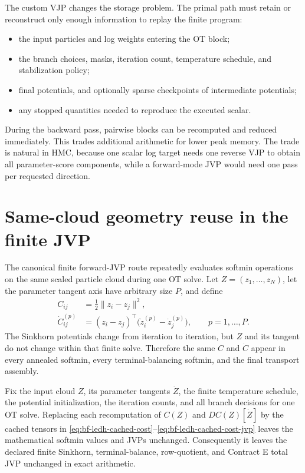 The custom VJP changes the storage problem.  The primal path must retain or
reconstruct only enough information to replay the finite program:
\begin{itemize}
  \item the input particles and log weights entering the OT block;
  \item the branch choices, masks, iteration count, temperature schedule, and
  stabilization policy;
  \item final potentials, and optionally sparse checkpoints of intermediate
  potentials;
  \item any stopped quantities needed to reproduce the executed scalar.
\end{itemize}
During the backward pass, pairwise blocks can be recomputed and reduced
immediately.  This trades additional arithmetic for lower peak memory.  The
trade is natural in HMC, because one scalar log target needs one reverse VJP to
obtain all parameter-score components, while a forward-mode JVP would need one
pass per requested direction.

\section{Same-cloud geometry reuse in the finite JVP}
\label{sec:bf-ledh-ot-same-cloud-cache}

The canonical finite forward-JVP route repeatedly evaluates softmin operations
on the same scaled particle cloud during one OT solve.  Let
\(Z=(z_1,\ldots,z_N)\), let the parameter tangent axis have arbitrary size
\(P\), and define
\begin{align}
\label{eq:bf-ledh-cached-cost}
  C_{ij}
  &=\frac12\lVert z_i-z_j\rVert^2,\\
\label{eq:bf-ledh-cached-cost-jvp}
  \dot C_{ij}^{(p)}
  &=(z_i-z_j)^\top
    \bigl(\dot z_i^{(p)}-\dot z_j^{(p)}\bigr),
  \qquad p=1,\ldots,P.
\end{align}
The Sinkhorn potentials change from iteration to iteration, but \(Z\) and its
tangent do not change within that finite solve.  Therefore the same \(C\) and
\(\dot C\) appear in every annealed softmin, every terminal-balancing softmin,
and the final transport assembly.

\begin{proposition}
\label{prop:bf-ledh-same-cloud-cache}
Fix the input cloud \(Z\), its parameter tangents \(\dot Z\), the finite
temperature schedule, the potential initialization, the iteration counts, and
all branch decisions for one OT solve.  Replacing each recomputation of
\(C(Z)\) and \(D C(Z)[\dot Z]\) by the cached tensors in
\eqref{eq:bf-ledh-cached-cost}--\eqref{eq:bf-ledh-cached-cost-jvp} leaves the
mathematical softmin values and JVPs unchanged.  Consequently it leaves the
declared finite Sinkhorn, terminal-balance, row-quotient, and Contract E total
JVP unchanged in exact arithmetic.
\end{proposition}

